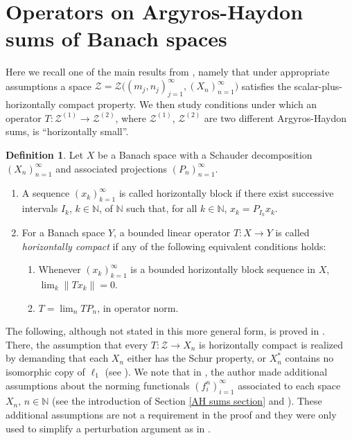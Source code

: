 \documentclass[11pt]{amsart}
\theoremstyle{definition}
\newtheorem{definition}[theorem]{Definition}
\newcommand{\N}{\mathbb{N}}
\numberwithin{equation}{section}
\begin{document}
\section{Operators on Argyros-Haydon sums of Banach spaces}

Here we recall one of the main results from \cite{zisimopoulou:2014}, namely that under appropriate assumptions a space $\mathcal{Z} = \mathcal{Z}\big((m_j,n_j)_{j=1}^\infty,(X_n)_{n=1}^\infty\big)$ satisfies the scalar-plus-horizontally compact property. We then study conditions under which an operator $T:\mathcal{Z}^{(1)}\to\mathcal{Z}^{(2)}$, where $\mathcal{Z}^{(1)}$, $\mathcal{Z}^{(2)}$ are two different Argyros-Haydon sums, is ``horizontally small''.

\label{AH sums operators section}

\begin{definition}
\label{HC definition}
Let $X$ be a Banach space with a Schauder decomposition $(X_n)_{n=1}^\infty$ and associated projections $(P_n)_{n=1}^\infty$.
\begin{enumerate}[label=(\alph*),leftmargin=19pt]
    
    \item A sequence $(x_k)_{k=1}^\infty$ is called horizontally block if there exist successive intervals $I_k$, $k\in\N$, of $\N$ such that, for all $k\in\N$, $x_k = P_{I_k}x_k$.

    \item For a Banach space $Y$, a bounded linear operator $T:X\to Y$ is called {\em horizontally compact} if any of the following equivalent conditions holds:
    \begin{enumerate}[label=(\greek*)]

        \item Whenever $(x_k)_{k=1}^\infty$ is a bounded horizontally block sequence in $X$, $\lim_k\|Tx_k\| = 0$.

        \item $T = \lim_nTP_n$, in operator norm.

    \end{enumerate}
    

\end{enumerate}

\end{definition}



The following, although not stated in this more general form, is proved in \cite[Proposition 7.8]{zisimopoulou:2014}. There, the assumption that every $T:\mathcal{Z}\to X_n$ is horizontally compact is realized by demanding that each $X_n$ either has the Schur property, or $X_n^*$ contains no isomorphic copy of $\ell_1$ (see \cite[Proposition 3.6]{zisimopoulou:2014}). We note that in \cite[page 21]{zisimopoulou:2014}, the author made additional assumptions about the norming functionals $(f_i^n)_{i=1}^\infty$ associated to each space $X_n$, $n\in\N$ (see the introduction of Section \ref{AH sums section} and ). These additional assumptions are not a requirement in the proof and they were only used to simplify a perturbation argument as in \cite{argyros:haydon:2011}.
\end{document}
